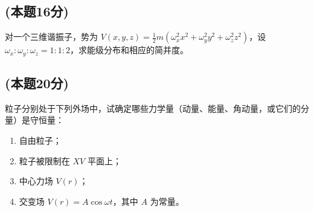 \subsection{(本题16分)}
对一个三维谐振子，势为 $V(x, y, z) = \frac{1}{2}m \left( \omega_x^2 x^2 + \omega_y^2 y^2 + \omega_z^2 z^2 \right)$，设 $\omega_x : \omega_y : \omega_z = 1 : 1 : 2$，求能级分布和相应的简并度。
\subsection{(本题20分)}
粒子分别处于下列外场中，试确定哪些力学量（动量、能量、角动量，或它们的分量）是守恒量：
\begin{enumerate}
\item 自由粒子；
\item 粒子被限制在 $XV$ 平面上；
\item 中心力场 $V(r)$；
\item 交变场 $V(r) = A \cos \omega t$，其中 $A$ 为常量。
\end{enumerate}
